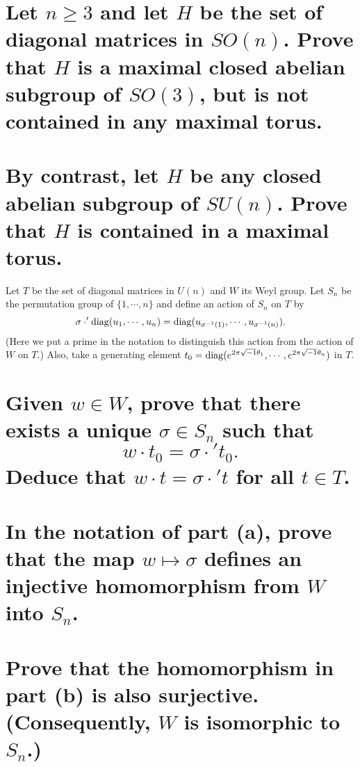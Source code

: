 \documentclass[
	pages,
	boxes,
	color=WildStrawberry
]{homework}
\begin{document}
\begin{problem}
\begin{parts}
	\part{Let $n \geq 3$ and let $H$ be the set of diagonal matrices in $SO(n)$. Prove that $H$ is a maximal closed abelian subgroup of $SO(3)$, but is not contained in any maximal torus.}\label{part:5a}
	\part{By contrast, let $H$ be any closed abelian subgroup of $SU(n)$. Prove that $H$ is contained in a maximal torus.}\label{part:5b}
\end{parts}
\end{problem}

\begin{problem}
Let $T$ be the set of diagonal matrices in $U(n)$ and $W$ its Weyl group. Let $S_n$ be the permutation group of $\{1, \cdots, n\}$ and define an action of $S_n$ on $T$ by
\[
	\sigma \cdot' \operatorname{diag}(u_1, \cdots, u_n) = \operatorname{diag}(u_{\sigma^{-1}(1)}, \cdots, u_{\sigma^{-1}(n)}).
\]
(Here we put a prime in the notation to distinguish this action from the action of $W$ on $T$.) Also, take a generating element $t_0 = \operatorname{diag}(e^{2\pi\sqrt{-1}\theta_1}, \cdots, e^{2\pi\sqrt{-1}\theta_n})$ in $T$.
\begin{parts}
	\part{Given $w \in W$, prove that there exists a unique $\sigma \in S_n$ such that
		\[
			w \cdot t_0 = \sigma \cdot' t_0.
		\]
		Deduce that $w \cdot t = \sigma \cdot' t$ for all $t  \in T$.}\label{part:6a}
	\part{In the notation of part (a), prove that the map $w \mapsto \sigma$ defines an injective homomorphism from $W$ into $S_n$.}\label{part:6b}
	\part{Prove that the homomorphism in part (b) is also surjective. (Consequently, $W$ is isomorphic to $S_n$.)}\label{part:6c}
\end{parts}

\end{problem}
\end{document}

